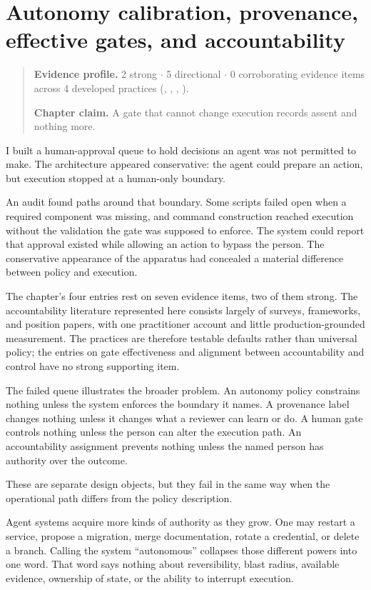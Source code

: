 \chapter{Autonomy calibration, provenance, effective gates, and accountability}
\label{ch17-autonomy-provenance-gates-accountability}
\begin{quote}
\textbf{Evidence profile.} 2 strong \(\cdot\) 5 directional \(\cdot\) 0 corroborating evidence items across 4 developed practices (, , , ).

\textbf{Chapter claim.} A gate that cannot change execution records assent and nothing more.
\end{quote}

I built a human-approval queue to hold decisions an agent was not permitted to make. The architecture appeared conservative: the agent could prepare an action, but execution stopped at a human-only boundary.

An audit found paths around that boundary. Some scripts failed open when a required component was missing, and command construction reached execution without the validation the gate was supposed to enforce. The system could report that approval existed while allowing an action to bypass the person. The conservative appearance of the apparatus had concealed a material difference between policy and execution.

The chapter's four entries rest on seven evidence items, two of them strong. The accountability literature represented here consists largely of surveys, frameworks, and position papers, with one practitioner account and little production-grounded measurement. The practices are therefore testable defaults rather than universal policy; the entries on gate effectiveness and alignment between accountability and control have no strong supporting item.

The failed queue illustrates the broader problem. An autonomy policy constrains nothing unless the system enforces the boundary it names. A provenance label changes nothing unless it changes what a reviewer can learn or do. A human gate controls nothing unless the person can alter the execution path. An accountability assignment prevents nothing unless the named person has authority over the outcome.

These are separate design objects, but they fail in the same way when the operational path differs from the policy description.

Agent systems acquire more kinds of authority as they grow. One may restart a service, propose a migration, merge documentation, rotate a credential, or delete a branch. Calling the system ``autonomous'' collapses those different powers into one word. That word says nothing about reversibility, blast radius, available evidence, ownership of state, or the ability to interrupt execution.

